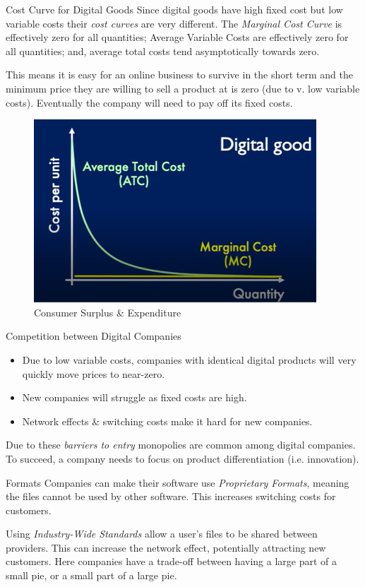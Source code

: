 \documentclass[11pt,a4paper]{article}
\begin{document}
  \begin{proposition}{Cost Curve for Digital Goods}
    Since digital goods have high fixed cost but low variable costs their \textit{cost curves} are very different. The \textit{Marginal Cost Curve} is effectively zero for all quantities; Average Variable Costs are effectively zero for all quantities; and, average total costs tend asymptotically towards zero.
    \par This means it is easy for an online business to survive in the short term and the minimum price they are willing to sell a product at is zero (due to v. low variable costs). Eventually the company will need to pay off its fixed costs.
  \end{proposition}

  \begin{figure}[ht!]
    \centering
    \includegraphics[width=.5\textwidth]{digitalCostCurve.PNG}
    \caption{Consumer Surplus \& Expenditure}
  \end{figure}

  \begin{remark}{Competition between Digital Companies}
    \begin{itemize}
      \item Due to low variable costs, companies with identical digital products will very quickly move prices to near-zero.
      \item New companies will struggle as fixed costs are high.
      \item Network effects \& switching costs make it hard for new companies.
    \end{itemize}
    Due to these \textit{barriers to entry} monopolies are common among digital companies. To succeed, a company needs to focus on product differentiation (i.e. innovation).
  \end{remark}

  \begin{remark}{Formats}
    Companies can make their software use \textit{Proprietary Formats}, meaning the files cannot be used by other software. This increases switching costs for customers.
    \par Using \textit{Industry-Wide Standards} allow a user's files to be shared between providers. This can increase the network effect, potentially attracting new customers. Here companies have a trade-off between having a large part of a small pie, or a small part of a large pie.
  \end{remark}
\end{document}
